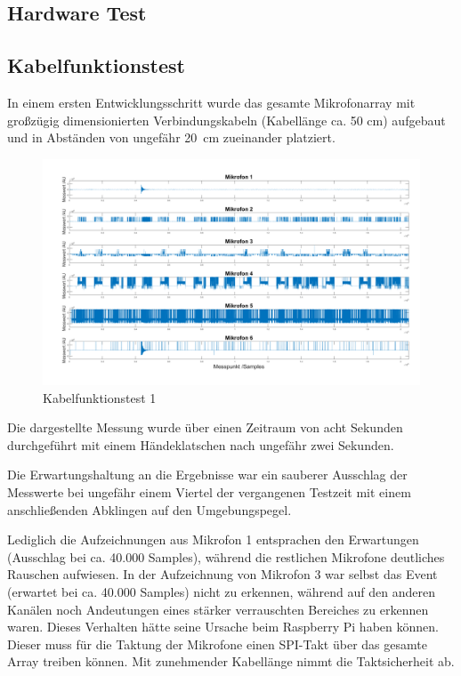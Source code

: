 \subsection{Hardware Test}

\subsection{Kabelfunktionstest}

In einem ersten Entwicklungsschritt wurde das gesamte Mikrofonarray mit großzügig dimensionierten Verbindungskabeln (Kabellänge ca. 50 cm) aufgebaut und in Abständen von ungefähr \SI{20}{cm} zueinander platziert. 

\begin{figure}[h]
	\begin{center}
		\includegraphics[scale=0.1]{Sections/Tests/Test_1_d}
	\end{center}
	\caption{Kabelfunktionstest 1}
	\label{fig:Test_1_d}
\end{figure}

Die dargestellte Messung wurde über einen Zeitraum von acht Sekunden durchgeführt mit einem Händeklatschen nach ungefähr zwei Sekunden.

Die Erwartungshaltung an die Ergebnisse war ein sauberer Ausschlag der Messwerte bei ungefähr einem Viertel der vergangenen Testzeit mit einem anschließenden Abklingen auf den Umgebungspegel.

Lediglich die Aufzeichnungen aus Mikrofon 1 entsprachen den Erwartungen (Ausschlag bei ca. 40.000 Samples), während die restlichen Mikrofone deutliches Rauschen aufwiesen. In der Aufzeichnung von Mikrofon 3 war selbst das Event (erwartet bei ca. 40.000 Samples) nicht zu erkennen, während auf den anderen Kanälen noch Andeutungen eines stärker verrauschten Bereiches zu erkennen waren. Dieses Verhalten hätte seine Ursache beim Raspberry Pi haben können. Dieser muss für die Taktung der Mikrofone einen SPI-Takt über das gesamte Array treiben können. Mit zunehmender Kabellänge nimmt die Taktsicherheit ab. 

